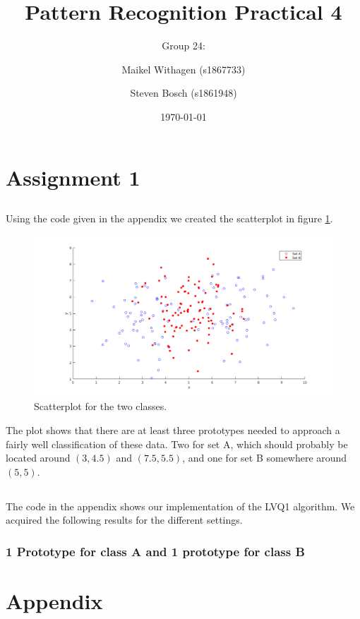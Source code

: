 \documentclass[10pt]{article}
\title{Pattern Recognition Practical 4}
\author{Group 24: \and Maikel Withagen (s1867733) \and Steven Bosch (s1861948)}
\date{\today}
\begin{document}
\section{Assignment 1}
\subsection{}
Using the code given in the appendix we created the scatterplot in figure \ref{fig1.1}.

\begin{figure}[H]
 \centering
 \includegraphics[width=\textwidth]{Fig1_1.png}
 \caption{Scatterplot for the two classes.}
 \label{fig1.1}
\end{figure}

The plot shows that there are at least three prototypes needed to approach a fairly well classification of these data. Two for set A, which should probably be located around $(3,4.5)$ and $(7.5, 5.5)$, and one for set B somewhere around $(5,5)$. 

\subsection{}
The code in the appendix shows our implementation of the LVQ1 algorithm. We acquired the following results for the different settings.

\subsubsection{1 Prototype for class A and 1 prototype for class B}


\section*{Appendix}




\maketitle
\end{document}
